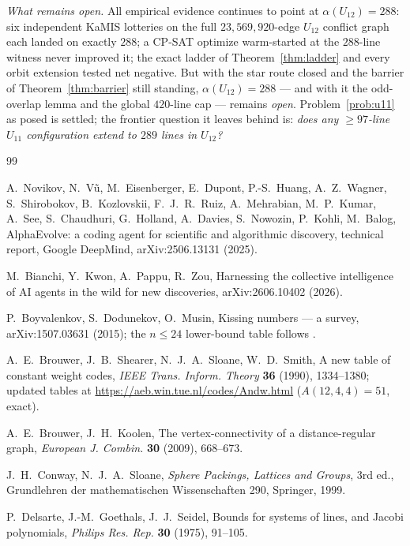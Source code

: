 \documentclass[11pt]{article}
\theoremstyle{remark}
\begin{document}
\emph{What remains open.} All empirical evidence continues to point at
$\alpha(U_{12})=288$: six independent KaMIS lotteries on the full
$23{,}569{,}920$-edge $U_{12}$ conflict graph each landed on exactly
$288$; a CP-SAT optimize warm-started at the $288$-line witness never
improved it; the exact ladder of Theorem~\ref{thm:ladder} and every orbit
extension tested net negative. But with the star route closed and the
barrier of Theorem~\ref{thm:barrier} still standing,
$\alpha(U_{12})=288$ --- and with it the odd-overlap lemma and the global
$420$-line cap --- remains \emph{open}. Problem~\ref{prob:u11} as posed
is settled; the frontier question it leaves behind is: \emph{does any
$\ge97$-line $U_{11}$ configuration extend to $289$ lines in $U_{12}$?}

\begin{thebibliography}{99}

A.~Novikov, N.~V\~u, M.~Eisenberger, E.~Dupont, P.-S.~Huang,
A.~Z.~Wagner, S.~Shirobokov, B.~Kozlovskii, F.~J.~R.~Ruiz,
A.~Mehrabian, M.~P.~Kumar, A.~See, S.~Chaudhuri, G.~Holland,
A.~Davies, S.~Nowozin, P.~Kohli, M.~Balog,
AlphaEvolve: a coding agent for scientific and algorithmic discovery,
technical report, Google DeepMind, arXiv:2506.13131 (2025).

M.~Bianchi, Y.~Kwon, A.~Pappu, R.~Zou,
Harnessing the collective intelligence of AI agents in the wild for new
discoveries, arXiv:2606.10402 (2026).

P.~Boyvalenkov, S.~Dodunekov, O.~Musin,
Kissing numbers --- a survey, arXiv:1507.03631 (2015); the $n\le24$
lower-bound table follows \cite[Table~1.5]{SPLAG}.

A.~E.~Brouwer, J.~B.~Shearer, N.~J.~A.~Sloane, W.~D.~Smith,
A new table of constant weight codes,
\emph{IEEE Trans. Inform. Theory} \textbf{36} (1990), 1334--1380;
updated tables at \url{https://aeb.win.tue.nl/codes/Andw.html}
($A(12,4,4)=51$, exact).

A.~E.~Brouwer, J.~H.~Koolen,
The vertex-connectivity of a distance-regular graph,
\emph{European J. Combin.} \textbf{30} (2009), 668--673.

J.~H.~Conway, N.~J.~A.~Sloane,
\emph{Sphere Packings, Lattices and Groups}, 3rd ed.,
Grundlehren der mathematischen Wissenschaften 290, Springer, 1999.

P.~Delsarte, J.-M.~Goethals, J.~J.~Seidel,
Bounds for systems of lines, and Jacobi polynomials,
\emph{Philips Res. Rep.} \textbf{30} (1975), 91--105.


\end{thebibliography}
\end{document}
